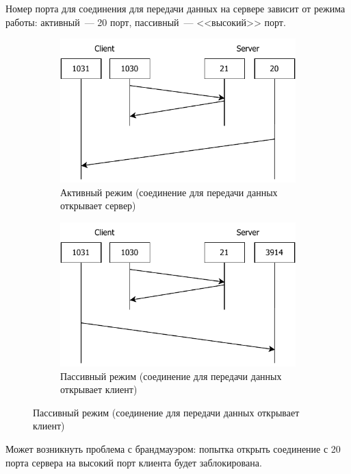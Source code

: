 Номер порта для соединения для передачи данных на сервере зависит от режима работы: активный~--- 20 порт, пассивный~--- <<высокий>> порт.

\begin{figure}[H]
    \centering
    \begin{subfigure}{0.45\textwidth}
        \includegraphics[width=\textwidth]{12/notes/inc/ftp-active}
        \caption{Активный режим (соединение для передачи данных открывает сервер)}
    \end{subfigure}
    \hspace{.5cm}
    \begin{subfigure}{0.45\textwidth}
        \includegraphics[width=\textwidth]{12/notes/inc/ftp-passive}
        \caption{Пассивный режим (соединение для передачи данных открывает клиент)}
    \end{subfigure}
\end{figure}

Может возникнуть проблема с брандмауэром: попытка открыть соединение с 20 порта сервера на высокий порт клиента будет заблокирована.

